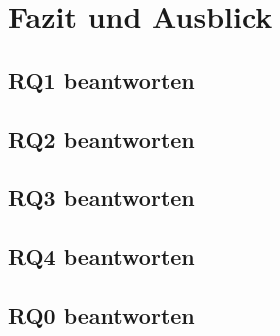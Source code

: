 
\chapter{Fazit und Ausblick}
\label{chap:fazit_und_ausblick}

\section{RQ1 beantworten}

\section{RQ2 beantworten}

\section{RQ3 beantworten}

\section{RQ4 beantworten}

\section{RQ0 beantworten}






